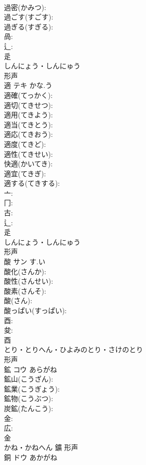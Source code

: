 \documentclass[8pt]{extreport}
\begin{document}
\begin{CJK}{UTF8}{min}
\\	過密(かみつ): 
\\	過ごす(すごす): 
\\	過ぎる(すぎる): 
\\	咼: 
\\	辶: 
\\	辵	
\\	しんにょう・しんにゅう	
\\	形声 
\\	適	テキ	かな.う		
\\	適確(てっかく): 
\\	適切(てきせつ): 
\\	適用(てきよう): 
\\	適当(てきとう): 
\\	適応(てきおう): 
\\	適度(てきど): 
\\	適性(てきせい): 
\\	快適(かいてき): 
\\	適宜(てきぎ): 
\\	適する(てきする): 
\\	亠: 
\\	冂: 
\\	古: 
\\	辶: 
\\	辵	
\\	しんにょう・しんにゅう	
\\	形声 
\\	酸	サン	す.い		
\\	酸化(さんか): 
\\	酸性(さんせい): 
\\	酸素(さんそ): 
\\	酸(さん): 
\\	酸っぱい(すっぱい): 
\\	酉: 
\\	夋: 
\\	酉	
\\	とり・とりへん・ひよみのとり・さけのとり	
\\	形声 
\\	鉱	コウ	あらがね		
\\	鉱山(こうざん): 
\\	鉱業(こうぎょう): 
\\	鉱物(こうぶつ): 
\\	炭鉱(たんこう): 
\\	金: 
\\	広: 
\\	金	
\\	かね・かねへん	鑛	形声 
\\	銅	ドウ	あかがね		

\end{CJK}
\end{document}
